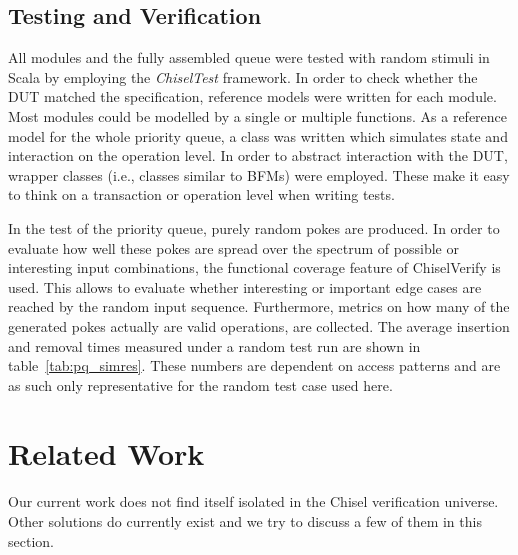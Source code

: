 \documentclass[conference]{IEEEtran}
\begin{document}
\subsection{Testing and Verification}

All modules and the fully assembled queue were tested with random stimuli in Scala by employing the \textit{ChiselTest} framework.
In order to check whether the DUT matched the specification, reference models were written for each module. Most modules 
could be modelled by a single or multiple functions. As a reference model for the whole priority queue, a class 
was written which simulates state and interaction on the operation level. In order to abstract interaction with the DUT,
wrapper classes (i.e., classes similar to BFMs) were employed. These make it easy to think on a transaction or 
operation level when writing tests.

In the test of the priority queue, purely random pokes are produced. In order to evaluate how well these pokes are spread over the spectrum 
of possible or interesting input combinations, the functional coverage feature of ChiselVerify is used. This allows to evaluate whether interesting 
or important edge cases are reached by the random input sequence. Furthermore, metrics on how many of the generated pokes actually are valid 
operations, are collected. The average insertion and removal times measured under a random test run are shown in table~\ref{tab:pq_simres}.
These numbers are dependent on access patterns and are as such only representative for the random test case used here.

\section{Related Work}
Our current work does not find itself isolated in the Chisel verification universe. Other solutions do currently exist and we try to discuss a few of them in this section.  
\end{document}
